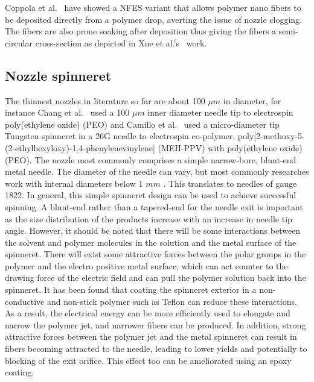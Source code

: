 \documentclass[5p,,preprint,12pt,twocolumn]{elsarticle}
\begin{document}
Coppola et al.\unskip~\cite{527120:11974307} have showed a NFES variant that allows polymer nano fibers to be deposited directly from a polymer drop, averting the issue of nozzle clogging. The fibers are also prone soaking after deposition thus giving the fibers a semi-circular cross-section as depicted in Xue et al.'s\unskip~\cite{527120:11974326} work. 



\subsection{Nozzle spinneret}The thinnest nozzles in literature so far are about 100 $\mu m $ in diameter, for instance Chang et al.\unskip~\cite{527120:11974306} used a 100 $\mu m $ inner diameter needle tip to electrospin poly(ethylene oxide) (PEO) and Camillo et al.\unskip~\cite{527120:12322072} used a micro-diameter tip Tungsten spinneret in a 26G needle to electrospin co-polymer, poly[2-methoxy-5-(2-ethylhexyloxy)-1,4-phenylenevinylene] (MEH-PPV) with poly(ethylene oxide) (PEO). The nozzle most commonly comprises a simple narrow-bore, blunt-end metal needle. The diameter of the needle can vary, but most commonly researches work with internal diameters below 1 $mm $ . This translates to needles of gauge 18{\textendash}22. In general, this simple spinneret design can be used to achieve successful spinning. A blunt-end rather than a tapered-end for the needle exit is important as the size distribution of the products increase with an increase in needle tip angle. However, it should be noted that there will be some interactions between the solvent and polymer molecules in the solution and the metal surface of the spinneret. There will exist some attractive forces between the polar groups in the polymer and the electro positive metal surface, which can act counter to the drawing force of the electric field and can pull the polymer solution back into the spinneret. It has been found that coating the spinneret exterior in a non-conductive and non-stick polymer such as Teflon can reduce these interactions.\unskip~\cite{527120:13082768} As a result, the electrical energy can be more efficiently used to elongate and narrow the polymer jet, and narrower fibers can be produced. In addition, strong attractive forces between the polymer jet and the metal spinneret can result in fibers becoming attracted to the needle, leading to lower yields and potentially to blocking of the exit orifice. This effect too can be ameliorated using an epoxy coating.\unskip~\cite{527120:13082811}
\end{document}
